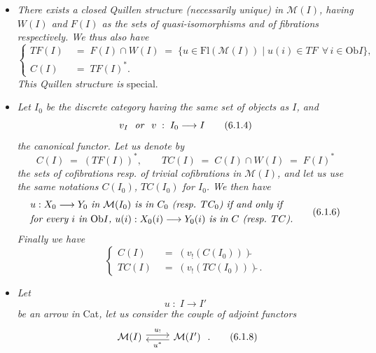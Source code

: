 \documentclass[11pt]{article}
\newcommand{\printedpage}[1]{\marginpar{\footnotesize p.~#1}}
\newcommand{\msp}[1]{\marginpar{\footnotesize [#1]}}
\newcommand{\tl}{\tilde{}}
\newcommand{\Ob}{\mathrm{Ob}}
\newcommand{\Fl}{\mathrm{Fl}}
\begin{document}
\begin{itemize}[leftmargin=2.5em]
\item[a)] \textit{There exists a closed Quillen structure (necessarily unique) in $\mathcal{M}(I)$, having $W(I)$ and $F(I)$ as the sets of quasi-isomorphisms and of fibrations respectively. We thus also have}
\[
\left\{
\begin{aligned}
TF(I) \;&=\; F(I)\cap W(I) \;=\; \{u\in \Fl(\mathcal{M}(I)) \mid u(i)\in TF \ \ \forall\, i\in \Ob I\},\\
C(I) \;&=\; TF(I)^{*}.
\end{aligned}
\right.
\tag*{(6.1.3)}
\]
\textit{This Quillen structure is} special.

\msp{page 99}
\item[b)] \textit{Let $I_0$ be the discrete category having the same set of objects as $I$, and}
\[
v_I \ \ \text{\textit{or}}\ \ v \;:\; I_0 \longrightarrow I
\tag*{(6.1.4)}
\]
\textit{the canonical functor. Let us denote by}
\[
C(I) \;=\; (TF(I))^{*}, \qquad TC(I) \;=\; C(I)\cap W(I) \;=\; F(I)^{*}
\tag*{(6.1.5)}
\]
\textit{the sets of cofibrations resp. of trivial cofibrations in $\mathcal{M}(I)$, and let us use the same notations $C(I_0)$, $TC(I_0)$ for $I_0$. We then have}
\[
\begin{aligned}
&\text{\textit{$u : X_0 \longrightarrow Y_0$ in $\mathcal{M}(I_0)$ is in $C_0$ (resp. $TC_0$) if and only if}}\\
&\text{\textit{for every $i$ in $\Ob I$, $u(i) : X_0(i) \longrightarrow Y_0(i)$ is in $C$ (resp. $TC$).}}
\end{aligned}
\tag*{(6.1.6)}
\]
\textit{Finally we have}
\[
\left\{
\begin{aligned}
C(I) \;&=\; (v_!(C(I_0)))\tl\\
TC(I) \;&=\; (v_!(TC(I_0)))\tl\,.
\end{aligned}
\right.
\tag*{(6.1.7)} %
\]

\item[c)] \textit{Let}
\[
u \;:\; I \longrightarrow I'
\]
\textit{be an arrow in} Cat\textit{, let us consider the couple of adjoint functors}
\[
\begin{tikzcd}
\mathcal{M}(I) \arrow[r, shift left, "u_!"] & \mathcal{M}(I') \arrow[l, shift left, "u^{*}"]
\end{tikzcd}
\;.
\tag*{(6.1.8)}
\]

\printedpage{50}


\end{itemize}
\end{document}
